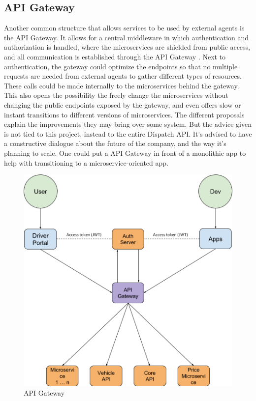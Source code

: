 \subsection{API Gateway}
Another common structure that allows services to be used by external agents is the API Gateway. It allows for a central middleware in which authentication and authorization is handled, where the microservices are shielded from public access, and all communication is established through the API Gateway \cite{api-gateway}. Next to authentication, the gateway could optimize the endpoints so that no multiple requests are needed from external agents to gather different types of resources. These calls could be made internally to the microservices behind the gateway. This also opens the possibility the freely change the microservices without changing the public endpoints exposed by the gateway, and even offers slow or instant transitions to different versions of microservices. The different proposals explain the improvements they may bring over some system. But the advice given is not tied to this project, instead to the entire Dispatch API. It’s advised to have a constructive dialogue about the future of the company, and the way it’s planning to scale. One could put a API Gateway in front of a monolithic app to help with transitioning to a microservice-oriented app.

\begin{figure}[H]
	\centering
	\includegraphics[width=.7\textwidth]{Auth3}
	\caption[API Gateway]{API Gateway}
	\label{fig:Auth3}
\end{figure}


%
